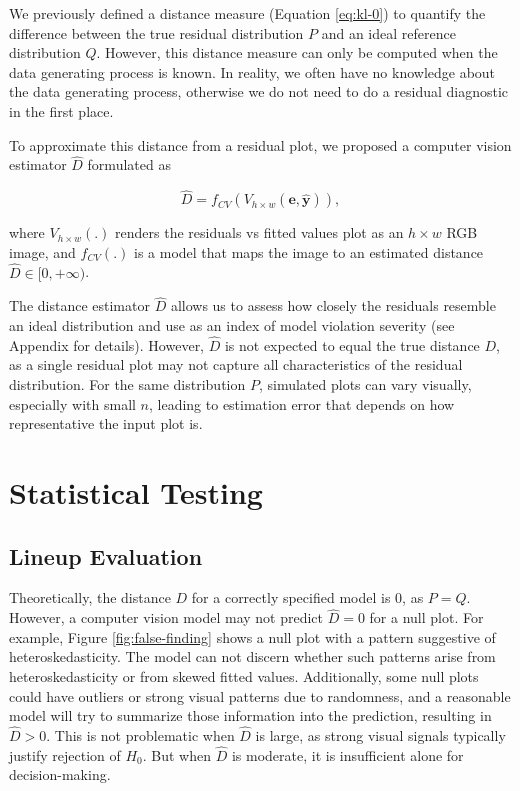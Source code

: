 \documentclass[]{interact}
\theoremstyle{plain}%
\theoremstyle{definition}
\theoremstyle{remark}
\begin{document}
We previously defined a distance measure (Equation \ref{eq:kl-0}) to
quantify the difference between the true residual distribution \(P\) and
an ideal reference distribution \(Q\). However, this distance measure
can only be computed when the data generating process is known. In
reality, we often have no knowledge about the data generating process,
otherwise we do not need to do a residual diagnostic in the first place.

To approximate this distance from a residual plot, we proposed a
computer vision estimator \(\hat{D}\) formulated as

\begin{equation} \label{eq:d-approx}
\hat{D} = f_{CV}(V_{h \times w}(\boldsymbol{e}, \hat{\boldsymbol{y}})),
\end{equation}

\noindent where \(V_{h \times w}(.)\) renders the residuals vs fitted
values plot as an \(h \times w\) RGB image, and \(f_{CV}(.)\) is a model
that maps the image to an estimated distance
\(\hat{D} \in [0, +\infty)\).

The distance estimator \(\hat{D}\) allows us to assess how closely the
residuals resemble an ideal distribution and use as an index of model
violation severity (see Appendix for details). However, \(\hat{D}\) is
not expected to equal the true distance \(D\), as a single residual plot
may not capture all characteristics of the residual distribution. For
the same distribution \(P\), simulated plots can vary visually,
especially with small \(n\), leading to estimation error that depends on
how representative the input plot is.

\section{Statistical Testing}\label{sec-model-statistical-testing}

\subsection{Lineup Evaluation}\label{sec-model-lineup-evaluation}

Theoretically, the distance \(D\) for a correctly specified model is
\(0\), as \(P = Q\). However, a computer vision model may not predict
\(\hat{D} = 0\) for a null plot. For example, Figure
\ref{fig:false-finding} shows a null plot with a pattern suggestive of
heteroskedasticity. The model can not discern whether such patterns
arise from heteroskedasticity or from skewed fitted values.
Additionally, some null plots could have outliers or strong visual
patterns due to randomness, and a reasonable model will try to summarize
those information into the prediction, resulting in \(\hat{D} > 0\).
This is not problematic when \(\hat{D}\) is large, as strong visual
signals typically justify rejection of \(H_0\). But when \(\hat{D}\) is
moderate, it is insufficient alone for decision-making.
\end{document}
